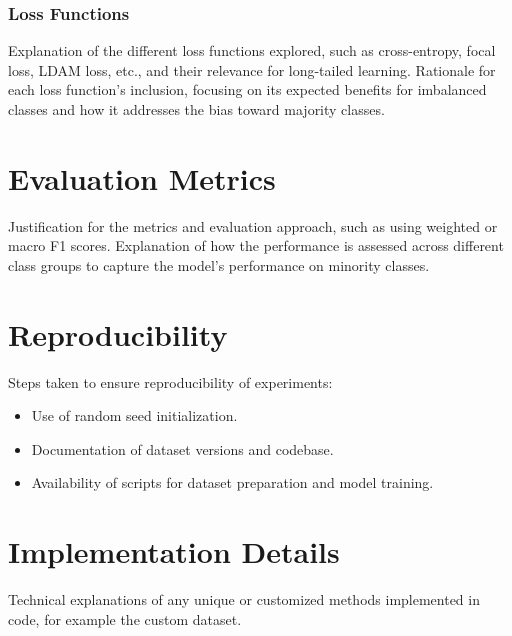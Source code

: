 
\subsubsection{Loss Functions}
Explanation of the different loss functions explored, such as cross-entropy, focal loss, LDAM loss, etc., and their relevance for long-tailed learning.
Rationale for each loss function's inclusion, focusing on its expected benefits for imbalanced classes and how it addresses the bias toward majority classes.



\section{Evaluation Metrics}
Justification for the metrics and evaluation approach, such as using weighted or macro F1 scores.
Explanation of how the performance is assessed across different class groups to capture the model’s performance on minority classes.

\section{Reproducibility}
Steps taken to ensure reproducibility of experiments:
\begin{itemize}
    \item Use of random seed initialization.
    \item Documentation of dataset versions and codebase.
    \item Availability of scripts for dataset preparation and model training.
\end{itemize}

\section{Implementation Details}
Technical explanations of any unique or customized methods implemented in code, for example the custom dataset.


